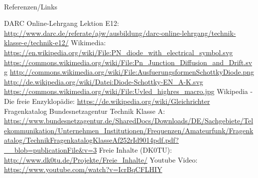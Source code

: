 \renewcommand{\refname}{Referenzen}

\hypertarget{refs}{}
\textcolor{white}{} \\ %
\Large Referenzen/Links
\footnotesize

\begin{thebibliography}{}
      DARC Online-Lehrgang Lektion E12:
                    \url{http://www.darc.de/referate/ajw/ausbildung/darc-online-lehrgang/technik-klasse-e/technik-e12/}
     	Wikimedia:
                    \url{https://en.wikipedia.org/wiki/File:PN_diode_with_electrical_symbol.svg}
                    \url{https://commons.wikimedia.org/wiki/File:Pn_Junction_Diffusion_and_Drift.svg}
                    \url{http://commons.wikimedia.org/wiki/File:AusfuerungsformenSchottkyDiode.png}
                    \url{http://de.wikipedia.org/wiki/Datei:Diode-Schottky-EN_A-K.svg}
                    \url{https://commons.wikimedia.org/wiki/File:Uvled_highres_macro.jpg}
                    \url{}
        Wikipedia - Die freie Enzyklopädie:
                    \url{https://de.wikipedia.org/wiki/Gleichrichter}
	   Fragenkatalog Bundesnetzagentur Technik Klasse A:                   
                    \url{https://www.bundesnetzagentur.de/SharedDocs/Downloads/DE/Sachgebiete/Telekommunikation/Unternehmen_Institutionen/Frequenzen/Amateurfunk/Fragenkatalog/TechnikFragenkatalogKlasseAf252rId9014pdf.pdf?__blob=publicationFile&v=3}
        Freie Inhalte (DK0TU):
                    \url{http://www.dk0tu.de/Projekte/Freie_Inhalte/}
         Youtube Video:                   
                    \url{https://www.youtube.com/watch?v=IcrBqCFLHIY}

\end{thebibliography} 


